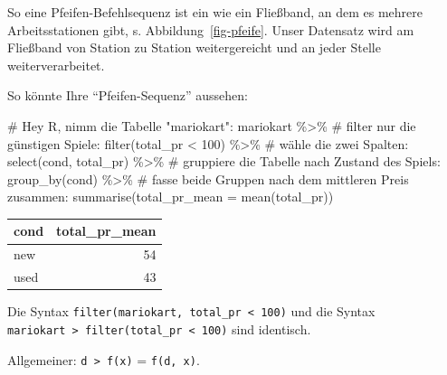 \documentclass[
  a4paper,
  DIV=11]{scrreprt}
\newenvironment{Shaded}{\begin{snugshade}}{\end{snugshade}}
\newcommand{\AttributeTok}[1]{\textcolor[rgb]{0.40,0.45,0.13}{#1}}
\newcommand{\CommentTok}[1]{\textcolor[rgb]{0.37,0.37,0.37}{#1}}
\newcommand{\DecValTok}[1]{\textcolor[rgb]{0.68,0.00,0.00}{#1}}
\newcommand{\FunctionTok}[1]{\textcolor[rgb]{0.28,0.35,0.67}{#1}}
\newcommand{\NormalTok}[1]{\textcolor[rgb]{0.00,0.23,0.31}{#1}}
\newcommand{\SpecialCharTok}[1]{\textcolor[rgb]{0.37,0.37,0.37}{#1}}
\theoremstyle{definition}
\theoremstyle{definition}
\theoremstyle{definition}
\theoremstyle{remark}
\begin{document}
So eine Pfeifen-Befehlsequenz ist ein wie ein Fließband, an dem es
mehrere Arbeitsstationen gibt, s. Abbildung~\ref{fig-pfeife}. Unser
Datensatz wird am Fließband von Station zu Station weitergereicht und an
jeder Stelle weiterverarbeitet.

So könnte Ihre ``Pfeifen-Sequenz'' aussehen:

\begin{Shaded}
\begin{Highlighting}[]
\CommentTok{\# Hey R, nimm die Tabelle "mariokart":}
\NormalTok{mariokart }\SpecialCharTok{\%\textgreater{}\%}  
   \CommentTok{\# filter nur die günstigen Spiele:}
  \FunctionTok{filter}\NormalTok{(total\_pr }\SpecialCharTok{\textless{}} \DecValTok{100}\NormalTok{) }\SpecialCharTok{\%\textgreater{}\%} 
  \CommentTok{\# wähle die zwei Spalten:}
  \FunctionTok{select}\NormalTok{(cond, total\_pr) }\SpecialCharTok{\%\textgreater{}\%}  
  \CommentTok{\# gruppiere die Tabelle nach Zustand des Spiels:}
  \FunctionTok{group\_by}\NormalTok{(cond) }\SpecialCharTok{\%\textgreater{}\%}  
  \CommentTok{\# fasse beide Gruppen nach dem mittleren Preis zusammen:}
  \FunctionTok{summarise}\NormalTok{(}\AttributeTok{total\_pr\_mean =} \FunctionTok{mean}\NormalTok{(total\_pr))  }
\end{Highlighting}
\end{Shaded}

\begin{longtable}[]{@{}lr@{}}
\toprule\noalign{}
cond & total\_pr\_mean \\
\midrule\noalign{}
\endhead
\bottomrule\noalign{}
\endlastfoot
new & 54 \\
used & 43 \\
\end{longtable}

\begin{tcolorbox}[enhanced jigsaw, leftrule=.75mm, opacitybacktitle=0.6, colback=white, colframe=quarto-callout-important-color-frame, coltitle=black, colbacktitle=quarto-callout-important-color!10!white, opacityback=0, left=2mm, breakable, titlerule=0mm, toptitle=1mm, bottomtitle=1mm, rightrule=.15mm, title=\textcolor{quarto-callout-important-color}{\faExclamation}\hspace{0.5em}{Wichtig}, arc=.35mm, bottomrule=.15mm, toprule=.15mm]

Die Syntax \texttt{filter(mariokart,\ total\_pr\ \textless{}\ 100)} und
die Syntax
\texttt{mariokart\ \textbar{}\textgreater{}\ filter(total\_pr\ \textless{}\ 100)}
sind identisch.

Allgemeiner: \texttt{d\ \textbar{}\textgreater{}\ f(x)} =
\texttt{f(d,\ x)}.

\end{tcolorbox}
\end{document}
